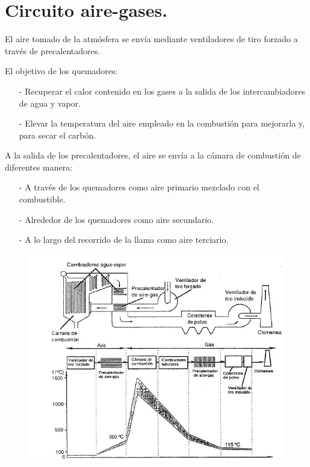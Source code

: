 \section{Circuito aire-gases.}
El aire tomado de la atmósfera se envía mediante ventiladores de tiro forzado a través de precalentadores.

El objetivo de los quemadores:
\begin{itemize}
	\item [-] Recuperar el calor contenido en los gases a la salida de los intercambiadores de agua y vapor.
	\item [-] Elevar la temperatura del aire empleado en la combustión para mejorarla y, para secar el carbón.
\end{itemize}


A la salida de los precalentadores, el aire se envía a la cámara de combustión de diferentes manera:
\begin{itemize}
	\item [-] A través de los quemadores como aire primario mezclado con el combustible.
	\item [-] Alrededor de los quemadores como aire secundario.
	\item [-] A lo largo del recorrido de la llama como aire terciario.
\end{itemize}

\begin{figure}[H]
	\centering
	\includegraphics[width=0.7\linewidth]{res/tema10/circuitoAwaGas}
	\label{fig:circuitoawagas}
\end{figure}

